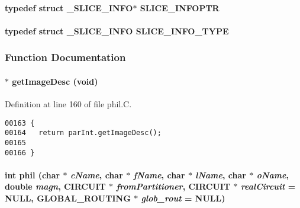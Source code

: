 \label{phil_glob.h_a5}
\paragraph{\setlength{\rightskip}{0pt plus 5cm}typedef struct {\bf \_\-SLICE\_\-INFO}$\ast$ SLICE\_\-INFOPTR}\hfill

\label{phil_glob.h_a4}
\paragraph{\setlength{\rightskip}{0pt plus 5cm}typedef struct {\bf \_\-SLICE\_\-INFO} SLICE\_\-INFO\_\-TYPE}\hfill



\subsubsection{Function Documentation}
\label{phil_glob.h_a2}
\paragraph{ $\ast$ get\-Image\-Desc (void)}\hfill



Definition at line 160 of file phil.C.\small\begin{verbatim}00163 {
00164   return parInt.getImageDesc();
00165 
00166 }
\end{verbatim}\normalsize 
\label{phil_glob.h_a0}
\paragraph{\setlength{\rightskip}{0pt plus 5cm}int phil (char $\ast$ {\em c\-Name}, char $\ast$ {\em f\-Name}, char $\ast$ {\em l\-Name}, char $\ast$ {\em o\-Name}, double {\em magn}, CIRCUIT $\ast$ {\em from\-Partitioner}, CIRCUIT $\ast$ {\em real\-Circuit} = NULL, {\bf GLOBAL\_\-ROUTING} $\ast$ {\em glob\_\-rout} = NULL)}\hfill



